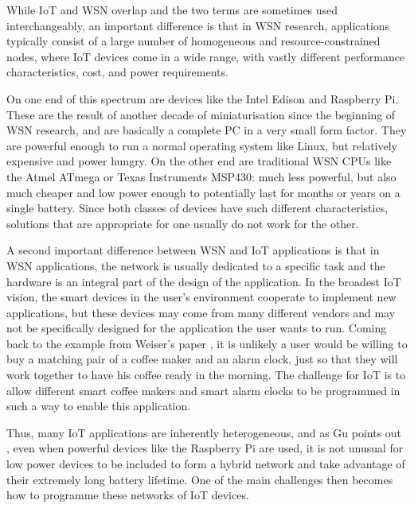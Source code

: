 While IoT and WSN overlap and the two terms are sometimes used interchangeably, an important difference is that in WSN research, applications typically consist of a large number of homogeneous and resource-constrained nodes, where IoT devices come in a wide range, with vastly different performance characteristics, cost, and power requirements.

On one end of this spectrum are devices like the Intel Edison and Raspberry Pi. These are the result of another decade of miniaturisation since the beginning of WSN research, and are basically a complete PC in a very small form factor. They are powerful enough to run a normal operating system like Linux, but relatively expensive and power hungry. On the other end are traditional WSN CPUs like the Atmel ATmega or Texas Instruments MSP430: much less powerful, but also much cheaper and low power enough to potentially last for months or years on a single battery. Since both classes of devices have such different characteristics, solutions that are appropriate for one usually do not work for the other.

A second important difference between WSN and IoT applications is that in WSN applications, the network is usually dedicated to a specific task and the hardware is an integral part of the design of the application. In the broadest IoT vision, the smart devices in the user's environment cooperate to implement new applications, but these devices may come from many different vendors and may not be specifically designed for the application the user wants to run. Coming back to the example from Weiser's paper \cite{Weiser:1991wz}, it is unlikely a user would be willing to buy a matching pair of a coffee maker and an alarm clock, just so that they will work together to have his coffee ready in the morning. The challenge for IoT is to allow different smart coffee makers and smart alarm clocks to be programmed in such a way to enable this application.

Thus, many IoT applications are inherently heterogeneous, and as Gu points out \cite{Gu:2006ww}, even when powerful devices like the Raspberry Pi are used, it is not unusual for low power devices to be included to form a hybrid network and take advantage of their extremely long battery lifetime. One of the main challenges then becomes how to programme these networks of IoT devices.



